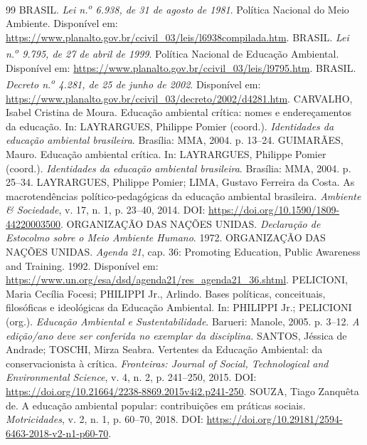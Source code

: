\documentclass[12pt,a4paper]{article}
\begin{document}
\begin{thebibliography}{99}
 BRASIL. \textit{Lei n.\textsuperscript{o} 6.938, de 31 de agosto de 1981}. Política Nacional do Meio Ambiente. Disponível em: \url{https://www.planalto.gov.br/ccivil_03/leis/l6938compilada.htm}.
 BRASIL. \textit{Lei n.\textsuperscript{o} 9.795, de 27 de abril de 1999}. Política Nacional de Educação Ambiental. Disponível em: \url{https://www.planalto.gov.br/ccivil_03/leis/l9795.htm}.
 BRASIL. \textit{Decreto n.\textsuperscript{o} 4.281, de 25 de junho de 2002}. Disponível em: \url{https://www.planalto.gov.br/ccivil_03/decreto/2002/d4281.htm}.
 CARVALHO, Isabel Cristina de Moura. Educação ambiental crítica: nomes e endereçamentos da educação. In: LAYRARGUES, Philippe Pomier (coord.). \textit{Identidades da educação ambiental brasileira}. Brasília: MMA, 2004. p. 13--24.
 GUIMARÃES, Mauro. Educação ambiental crítica. In: LAYRARGUES, Philippe Pomier (coord.). \textit{Identidades da educação ambiental brasileira}. Brasília: MMA, 2004. p. 25--34.
 LAYRARGUES, Philippe Pomier; LIMA, Gustavo Ferreira da Costa. As macrotendências político-pedagógicas da educação ambiental brasileira. \textit{Ambiente \& Sociedade}, v. 17, n. 1, p. 23--40, 2014. DOI: \url{https://doi.org/10.1590/1809-44220003500}.
 ORGANIZAÇÃO DAS NAÇÕES UNIDAS. \textit{Declaração de Estocolmo sobre o Meio Ambiente Humano}. 1972.
 ORGANIZAÇÃO DAS NAÇÕES UNIDAS. \textit{Agenda 21}, cap. 36: Promoting Education, Public Awareness and Training. 1992. Disponível em: \url{https://www.un.org/esa/dsd/agenda21/res_agenda21_36.shtml}.
 PELICIONI, Maria Cecília Focesi; PHILIPPI Jr., Arlindo. Bases políticas, conceituais, filosóficas e ideológicas da Educação Ambiental. In: PHILIPPI Jr.; PELICIONI (org.). \textit{Educação Ambiental e Sustentabilidade}. Barueri: Manole, 2005. p. 3--12. \textit{A edição/ano deve ser conferida no exemplar da disciplina.}
 SANTOS, Jéssica de Andrade; TOSCHI, Mirza Seabra. Vertentes da Educação Ambiental: da conservacionista à crítica. \textit{Fronteiras: Journal of Social, Technological and Environmental Science}, v. 4, n. 2, p. 241--250, 2015. DOI: \url{https://doi.org/10.21664/2238-8869.2015v4i2.p241-250}.
 SOUZA, Tiago Zanquêta de. A educação ambiental popular: contribuições em práticas sociais. \textit{Motricidades}, v. 2, n. 1, p. 60--70, 2018. DOI: \url{https://doi.org/10.29181/2594-6463-2018-v2-n1-p60-70}.
\end{thebibliography}
\end{document}
